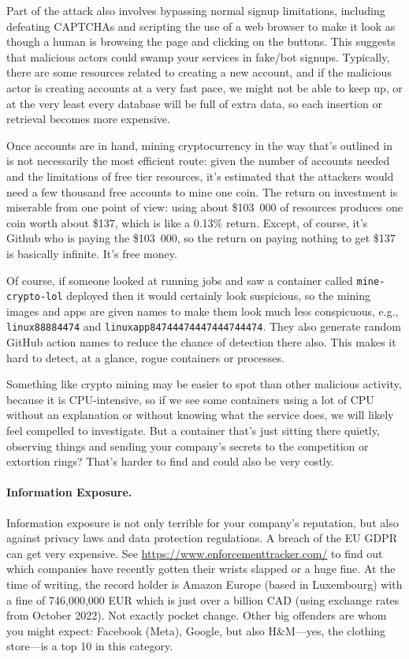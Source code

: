 Part of the attack also involves bypassing normal signup limitations, including defeating CAPTCHAs and scripting the use of a web browser to make it look as though a human is browsing the page and clicking on the buttons. This suggests that malicious actors could swamp your services in fake/bot signups. Typically, there are some resources related to creating a new account, and if the malicious actor is creating accounts at a very fast pace, we might not be able to keep up, or at the very least every database will be full of extra data, so each insertion or retrieval becomes more expensive.

Once accounts are in hand, mining cryptocurrency in the way that's outlined in~\cite{sysdig} is not necessarily the most efficient route: given the number of accounts needed and the limitations of free tier resources, it's estimated that the attackers would need a few thousand free accounts to mine one coin. The return on investment is miserable from one point of view: using about \$103~000 of resources produces one coin worth about \$137, which is like a 0.13\% return. Except, of course, it's Github who is paying the \$103~000, so the return on paying nothing to get \$137 is basically infinite. It's free money.

Of course, if someone looked at running jobs and saw a container called \texttt{mine-crypto-lol} deployed then it would certainly look suspicious, so the mining images and apps are given names to make them look much less conspicuous, e.g., \texttt{linux88884474} and \texttt{linuxapp84744474447444744474}. They also generate random GitHub action names to reduce the chance of detection there also. This makes it hard to detect, at a glance, rogue containers or processes. 

Something like crypto mining may be easier to spot than other malicious activity, because it is CPU-intensive, so if we see some containers using a lot of CPU without an explanation or without knowing what the service does, we will likely feel compelled to investigate. But a container that's just sitting there quietly, observing things and sending your company's secrets to the competition or extortion rings? That's harder to find and could also be very costly.

\paragraph{Information Exposure.}
Information exposure is not only terrible for your company's reputation, but also against privacy laws and data protection regulations. A breach of the EU GDPR can get very expensive. See \url{https://www.enforcementtracker.com/} to find out which companies have recently gotten their wrists slapped or a huge fine. At the time of writing, the record holder is Amazon Europe (based in Luxembourg) with a fine of 	746,000,000 EUR which is just over a billion CAD (using exchange rates from October 2022). Not exactly pocket change. Other big offenders are whom you might expect: Facebook (Meta), Google, but also H\&M---yes, the clothing store---is a top 10 in this category.

